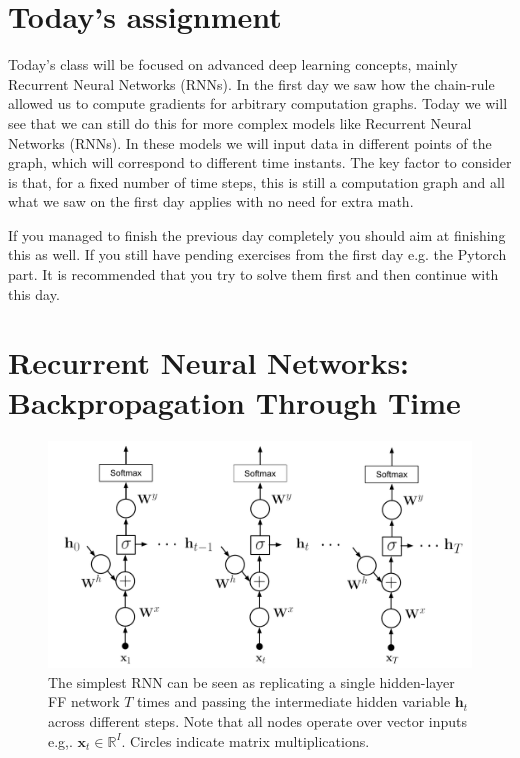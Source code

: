 \section{Today's assignment}
Today's class will be focused on advanced deep learning concepts, mainly
Recurrent Neural Networks (RNNs). In the first day we saw how the chain-rule
allowed us to compute gradients for arbitrary computation graphs. Today we will
see that we can still do this for more complex models like Recurrent Neural
Networks (RNNs). In these models we will input data in different points of the
graph, which will correspond to different time instants. The key factor to
consider is that, for a fixed number of time steps, this is still a computation
graph and all what we saw on the first day applies with no need for extra math.

If you managed to finish the previous day completely you should aim at finishing
this as well. If you still have pending exercises from the first day e.g. the
Pytorch part. It is recommended that you try to solve them first and then
continue with this day. 

\section{Recurrent Neural Networks: Backpropagation Through Time}

\begin{figure}[!h]
\centering
\includegraphics[scale=0.6]{figs/deep_learning/RNN.pdf}
\caption{The simplest RNN can be seen as replicating a single hidden-layer FF
network $T$ times and passing the intermediate hidden variable $\mathbf{h}_t$
across different steps. Note that all nodes operate over vector inputs e.g,.
$\mathbf{x}_t \in \mathbb{R}^I$. Circles indicate matrix multiplications.}
\label{fig:RNN}
\end{figure}

